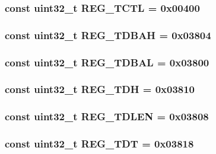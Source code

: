 \hypertarget{namespaceiGbReg_a821ebe9f73862e5f08d712f01cfd626d}{
\subsubsection[{REG\_\-TCTL}]{\setlength{\rightskip}{0pt plus 5cm}const {\bf uint32\_\-t} {\bf REG\_\-TCTL} = 0x00400}}
\label{namespaceiGbReg_a821ebe9f73862e5f08d712f01cfd626d}
\hypertarget{namespaceiGbReg_a7042bc647b8afdb47eee2760c44fa592}{
\subsubsection[{REG\_\-TDBAH}]{\setlength{\rightskip}{0pt plus 5cm}const {\bf uint32\_\-t} {\bf REG\_\-TDBAH} = 0x03804}}
\label{namespaceiGbReg_a7042bc647b8afdb47eee2760c44fa592}
\hypertarget{namespaceiGbReg_ae124cd934d893dedf0c92172b4899701}{
\subsubsection[{REG\_\-TDBAL}]{\setlength{\rightskip}{0pt plus 5cm}const {\bf uint32\_\-t} {\bf REG\_\-TDBAL} = 0x03800}}
\label{namespaceiGbReg_ae124cd934d893dedf0c92172b4899701}
\hypertarget{namespaceiGbReg_aff7b48a39ed90fc8943a7b7042c9e996}{
\subsubsection[{REG\_\-TDH}]{\setlength{\rightskip}{0pt plus 5cm}const {\bf uint32\_\-t} {\bf REG\_\-TDH} = 0x03810}}
\label{namespaceiGbReg_aff7b48a39ed90fc8943a7b7042c9e996}
\hypertarget{namespaceiGbReg_ae885006ab462d77f5678312d6181c978}{
\subsubsection[{REG\_\-TDLEN}]{\setlength{\rightskip}{0pt plus 5cm}const {\bf uint32\_\-t} {\bf REG\_\-TDLEN} = 0x03808}}
\label{namespaceiGbReg_ae885006ab462d77f5678312d6181c978}
\hypertarget{namespaceiGbReg_ac15be2850d41581ca8530f32a90e5b0f}{
\subsubsection[{REG\_\-TDT}]{\setlength{\rightskip}{0pt plus 5cm}const {\bf uint32\_\-t} {\bf REG\_\-TDT} = 0x03818}}
